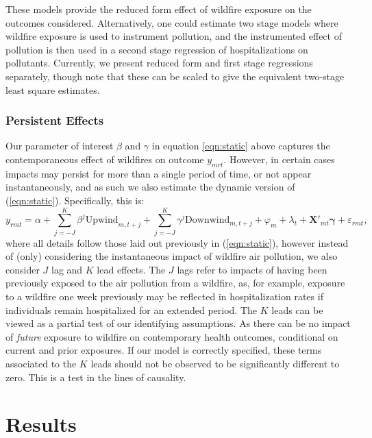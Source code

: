 \documentclass[11pt]{article}
\begin{document}
\begin{spacing}{1.5}
These models provide the reduced form effect of wildfire exposure on the outcomes considered.  Alternatively, one could estimate two stage models where wildfire exposure is used to instrument pollution, and the instrumented effect of pollution is then used in a second stage regression of hospitalizations on pollutants.  Currently, we present reduced form and first stage regressions separately, though note that these can be scaled to give the equivalent two-stage least square estimates.


\subsubsection{Persistent Effects}
\label{sscn:comunatime_p}
Our parameter of interest $\beta$ and $\gamma$ in equation \ref{eqn:static} above captures the contemporaneous effect of wildfires on outcome $y_{mrt}$.  However, in certain cases impacts may persist for more than a single period of time, or not appear instantaneously, and as such we also estimate the dynamic version of (\ref{eqn:static}).  Specifically, this is:
\begin{equation}
\label{eq:dynamic}
y_{rmt}=\alpha + \sum_{j=-J}^K\beta^{j}\text{Upwind}_{m,t+j} + \sum_{j=-J}^K\gamma^{j}\text{Downwind}_{m,t+j} + \varphi_m + \lambda_t + \bm{X}'_{mt}\bm{\gamma} + \varepsilon_{rmt},
\end{equation}
where all  details follow those laid out previously in (\ref{eqn:static}), however instead of (only) considering the instantaneous impact of wildfire air pollution, we also consider $J$ lag and $K$ lead effects.  The $J$ lags refer to impacts of having been previously exposed to the air pollution from a wildfire, as, for example, exposure to a wildfire one week previously may be reflected in hospitalization rates if individuals remain hospitalized for an extended period. The $K$ leads can be viewed as a partial test of our identifying assumptions. As there can be no impact of \emph{future} exposure to wildfire on contemporary health outcomes, conditional on current and prior exposures. If our model is correctly specified, these terms associated to the $K$ leads should not be observed to be significantly different to zero. This is a test in the lines of \citet{Granger1969} causality. 



\section{Results}
\label{scn:results}


\end{spacing}
\end{document}
